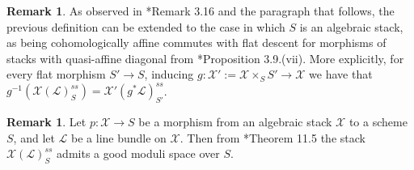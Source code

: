 \documentclass{amsart}
\newcommand{\cL}{\mathcal{L}}
\newcommand{\cX}{\mathcal{X}}
\theoremstyle{definition}
\newtheorem{Remark}[theorem]{Remark}
\theoremstyle{definition}
\begin{document}
{ \begin{Remark}
     As observed in \cite{ER21}*{Remark 3.16} and the paragraph that follows, the previous definition can be extended to the case in which $S$ is an algebraic stack, as being cohomologically affine commutes with flat descent for morphisms of stacks with quasi-affine diagonal from \cite{Alp}*{Proposition 3.9.(vii)}. More explicitly, for every flat morphism $S'\to S$, inducing $g:\cX':=\cX\times_SS'\to \cX$ we have that $g^{-1}(\cX(\cL)^{ss}_S) = \cX'(g^*\cL)^{ss}_{S'}$.
 \end{Remark}
 \begin{Remark}
     Let $p:\cX\to S$ be a morphism from an algebraic stack $\cX$ to a scheme $S$, and let $\cL$ be a line bundle on $\cX$. Then from \cite{Alp}*{Theorem 11.5} the stack $\cX(\cL)^{ss}_S$ admits a good moduli space over $S$.
 \end{Remark}

}
\end{document}

